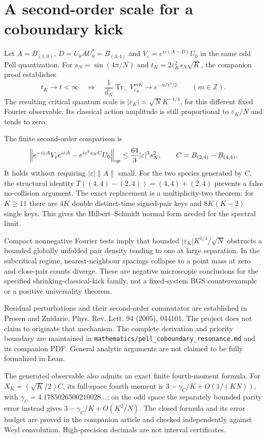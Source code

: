 \section{A second-order scale for a coboundary kick}
Let $A=B_{(1,0)}$, $D=U_0AU_0^*=B_{(3,4)}$ and
$V_\varepsilon=e^{i\varepsilon(A-D)}U_0$ in the same odd Pell quantization.
For $s_N=\sin(4\pi/N)$ and $t_K=2\varepsilon_K^2s_N\sqrt K$, the
companion proof establishes
\[
 t_K\longrightarrow t<\infty
 \quad\Longrightarrow\quad
 \frac{1}{d_N}\operatorname{Tr}_{-}V_{\varepsilon_K}^{mK}
       \longrightarrow e^{-m^2t^2/2}
 \qquad(m\in\mathbb Z).
\]
The resulting critical quantum scale is
$|\varepsilon_K|\asymp\sqrt N K^{-1/4}$, for this different fixed Fourier
observable. Its classical action amplitude is still proportional to
$\varepsilon_K/N$ and tends to zero.

The finite second-order comparison is
\[
 \left\|e^{-i\varepsilon A}V_\varepsilon e^{i\varepsilon A}
          -e^{i\varepsilon^2s_N C}U_0\right\|_{\rm op}
 \leq \frac{64}{3}|\varepsilon|^3s_N^2,
 \qquad C=B_{(2,4)}-B_{(4,4)}.
\]
It holds without requiring $|\varepsilon|\|A\|$ small. For the two
species generated by $C$, the structural identity
$T((4,4)-(2,4))=(4,4)+(2,4)$ prevents a false no-collision argument.
The exact replacement is a multiplicity-two theorem: for $K\geq11$ there
are $4K$ double distinct-time signed-pair keys and $8K(K-2)$ single keys.
This gives the Hilbert--Schmidt normal form needed for the spectral limit.

Compact nonnegative Fourier tests imply that bounded
$|\varepsilon_K|K^{1/4}/\sqrt N$ obstructs a bounded globally unfolded
pair density tending to one at large separation. In the subcritical regime,
nearest-neighbour spacings collapse to a point mass at zero and close-pair
counts diverge. These are negative microscopic conclusions for the specified
shrinking-classical-kick family, not a fixed-system BGS counterexample or a
positive universality theorem.

Residual perturbations and their second-order commutator are established in
Prosen and Znidaric, Phys. Rev. Lett. 94 (2005), 044101. The project does not
claim to originate that mechanism. The complete derivation and priority
boundary are maintained in
\texttt{mathematics/pell\_coboundary\_resonance.md} and its companion PDF.
General analytic arguments are not claimed to be fully formalized in Lean.


The generated observable also admits an exact finite fourth-moment formula.
For $X_K=(\sqrt K/2)\overline C$, its full-space fourth moment is
$3-\gamma_C/K+O(1/(KN))$, with
$\gamma_C=4.1785026500210028\ldots$; on the odd space the separately bounded
parity error instead gives $3-\gamma_C/K+O(K^2/N)$. The closed formula and
its error budget are proved in the companion article and checked independently
against Weyl convolution. High-precision decimals are not interval certificates.

